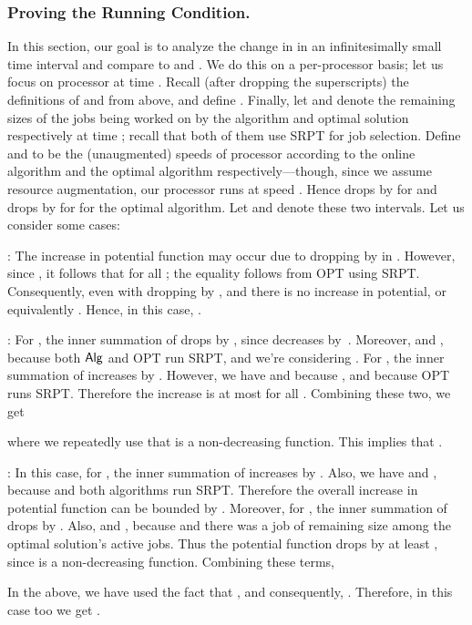 \documentclass[11pt]{article}
\newcommand{\opt}{\textrm{\sc OPT}\xspace}
\newcommand{\alg}{\ensuremath{{\sf Alg}}\xspace}
\begin{document}
\subsubsection{Proving the Running Condition.}
In this section, our goal is to analyze the change in  in an
infinitesimally small time interval  and compare 
to  and . We do this on a per-processor basis; let
us focus on processor  at time . Recall (after dropping the  superscripts) the definitions of
 and  from above, and define
. Finally, let  and 
denote the remaining sizes of the jobs being worked on by the algorithm
and optimal solution respectively at time ; recall that both of them
use SRPT for job selection.  Define  and  to be the (unaugmented) speeds of processor 
according to the online algorithm and the optimal algorithm
respectively---though, since we assume resource augmentation, our
processor runs at speed .  Hence
 drops by  for 
and  drops by  for  for the
optimal algorithm. Let  and
 denote these two intervals. Let us consider
some cases:



\medskip {}: The increase in
potential function may occur due to  dropping by  in . However, since , it follows that
 for all ;
the equality follows from \opt using SRPT.  Consequently, even with
 dropping by ,  and there
is no increase in potential, or equivalently .
Hence, in this case, .

\medskip {}: For , the inner summation of  drops by , since
 decreases by~. Moreover,  and
, because both \alg and \opt run
SRPT, and we're considering .  For , the
inner summation of  increases by .  However, we have
 and  because , and  because \opt runs SRPT.  Therefore the
increase is at most 
for all . Combining these two, we get

where we repeatedly use that  is a non-decreasing function.
This implies that .

\medskip {}: In this case, for , the inner summation of 
increases by . Also, we have  and
, because  and both algorithms
run SRPT. Therefore the overall increase in potential function can be
bounded by . Moreover, for , the inner summation of 
drops by . Also,  and ,
because  and there was a job of remaining size  among
the optimal solution's active jobs. Thus the potential function drops by
at least , since  is a non-decreasing function.
Combining these terms,

In the above, we have used the fact that , and consequently, . Therefore, in this case too we get .
\end{document}
